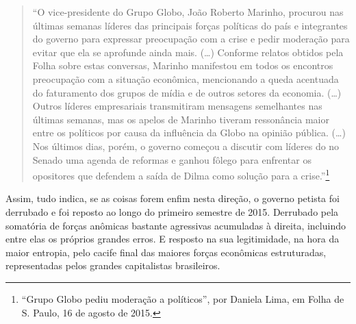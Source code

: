 \begin{quote}
``O vice-presidente do Grupo Globo, João Roberto Marinho, procurou nas
últimas semanas líderes das principais forças políticas do país e
integrantes do governo para expressar preocupação com a crise e pedir
moderação para evitar que ela se aprofunde ainda mais. (…) Conforme
relatos obtidos pela Folha sobre estas conversas, Marinho
manifestou em todos os encontros preocupação com a situação econômica,
mencionando a queda acentuada do faturamento dos grupos de mídia e de
outros setores da economia. (…) Outros líderes empresariais
transmitiram mensagens semelhantes nas últimas semanas, mas os apelos de
Marinho tiveram ressonância maior entre os políticos por causa da
influência da Globo na opinião pública. (…) Nos últimos dias, porém, o
governo começou a discutir com líderes do  no Senado uma agenda de
reformas e ganhou fôlego para enfrentar os opositores que defendem a
saída de Dilma como solução para a crise.''\footnote{``Grupo Globo pediu
  moderação a políticos'', por Daniela Lima, em Folha de S. Paulo, 16 de
  agosto de 2015.}
\end{quote}

Assim, tudo indica, se as coisas forem enfim nesta direção, o governo
petista foi derrubado e foi reposto ao longo do primeiro semestre de
2015. Derrubado pela somatória de forças anômicas bastante agressivas
acumuladas à direita, incluindo entre elas os próprios grandes erros. E
resposto na sua legitimidade, na hora da maior entropia, pelo cacife
final das maiores forças econômicas estruturadas, representadas pelos
grandes capitalistas brasileiros.

